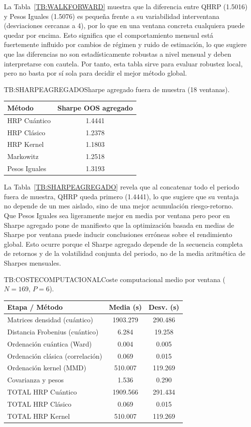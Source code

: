 La Tabla~\ref{TB:WALKFORWARD} muestra que la diferencia entre QHRP (1.5016) y Pesos Iguales (1.5076) es pequeña frente a su variabilidad interventana (desviaciones cercanas a 4), por lo que en una ventana concreta cualquiera puede quedar por encima. Esto significa que el comportamiento mensual está fuertemente influido por cambios de régimen y ruido de estimación, lo que sugiere que las diferencias no son estadísticamente robustas a nivel mensual y deben interpretarse con cautela. Por tanto, esta tabla sirve para evaluar robustez local, pero no basta por sí sola para decidir el mejor método global.

\begin{table}[Sharpe agregado OOS]{TB:SHARPEAGREGADO}{Sharpe agregado fuera de muestra (18 ventanas).}
\begin{tabular}{lc}
\hline
\textbf{Método} & \textbf{Sharpe OOS agregado} \\
\hline
HRP Cuántico & 1.4441 \\
HRP Clásico & 1.2378 \\
HRP Kernel & 1.1803 \\
Markowitz & 1.2518 \\
Pesos Iguales & 1.3193 \\
\hline
\end{tabular}
\end{table}

La Tabla~\ref{TB:SHARPEAGREGADO} revela que al concatenar todo el periodo fuera de muestra, QHRP queda primero (1.4441), lo que sugiere que su ventaja no depende de un mes aislado, sino de una mejor acumulación riesgo-retorno. Que Pesos Iguales sea ligeramente mejor en media por ventana pero peor en Sharpe agregado pone de manifiesto que la optimización basada en medias de Sharpe por ventana puede inducir conclusiones erróneas sobre el rendimiento global. Esto ocurre porque el Sharpe agregado depende de la secuencia completa de retornos y de la volatilidad conjunta del periodo, no de la media aritmética de Sharpes mensuales.

\begin{table}[Coste computacional]{TB:COSTECOMPUTACIONAL}{Coste computacional medio por ventana ($N=169$, $P=6$).}
\begin{tabular}{lcc}
\hline
\textbf{Etapa / Método} & \textbf{Media (s)} & \textbf{Desv. (s)} \\
\hline
Matrices densidad (cuántico) & 1903.279 & 290.486 \\
Distancia Frobenius (cuántico) & 6.284 & 19.258 \\
Ordenación cuántica (Ward) & 0.004 & 0.005 \\
Ordenación clásica (correlación) & 0.069 & 0.015 \\
Ordenación kernel (MMD) & 510.007 & 119.269 \\
Covarianza y pesos & 1.536 & 0.290 \\
\hline
TOTAL HRP Cuántico & 1909.566 & 291.434 \\
TOTAL HRP Clásico & 0.069 & 0.015 \\
TOTAL HRP Kernel & 510.007 & 119.269 \\
\hline
\end{tabular}
\end{table}

